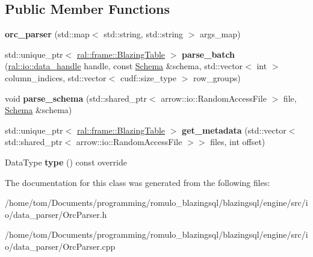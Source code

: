 \subsection*{Public Member Functions}
\begin{DoxyCompactItemize}
\item 
\mbox{\label{classral_1_1io_1_1orc__parser_af352d5ef0c56ae3cf70afc26cdf0ba78}} 
{\bfseries orc\+\_\+parser} (std\+::map$<$ std\+::string, std\+::string $>$ args\+\_\+map)
\item 
\mbox{\label{classral_1_1io_1_1orc__parser_a67cf475095de14b92c1c61a8f784230d}} 
std\+::unique\+\_\+ptr$<$ \hyperlink{classral_1_1frame_1_1BlazingTable}{ral\+::frame\+::\+Blazing\+Table} $>$ {\bfseries parse\+\_\+batch} (\hyperlink{structral_1_1io_1_1data__handle}{ral\+::io\+::data\+\_\+handle} handle, const \hyperlink{classral_1_1io_1_1Schema}{Schema} \&schema, std\+::vector$<$ int $>$ column\+\_\+indices, std\+::vector$<$ cudf\+::size\+\_\+type $>$ row\+\_\+groups)
\item 
\mbox{\label{classral_1_1io_1_1orc__parser_ad3ac521b63ec30e23d2759b6c37c8ece}} 
void {\bfseries parse\+\_\+schema} (std\+::shared\+\_\+ptr$<$ arrow\+::io\+::\+Random\+Access\+File $>$ file, \hyperlink{classral_1_1io_1_1Schema}{Schema} \&schema)
\item 
\mbox{\label{classral_1_1io_1_1orc__parser_aa25ff68d31995b000b7805f0f313e46b}} 
std\+::unique\+\_\+ptr$<$ \hyperlink{classral_1_1frame_1_1BlazingTable}{ral\+::frame\+::\+Blazing\+Table} $>$ {\bfseries get\+\_\+metadata} (std\+::vector$<$ std\+::shared\+\_\+ptr$<$ arrow\+::io\+::\+Random\+Access\+File $>$$>$ files, int offset)
\item 
\mbox{\label{classral_1_1io_1_1orc__parser_a91a7ef5f1263d5ce111b691250176e6b}} 
Data\+Type {\bfseries type} () const override
\end{DoxyCompactItemize}


The documentation for this class was generated from the following files\+:\begin{DoxyCompactItemize}
\item 
/home/tom/\+Documents/programming/romulo\+\_\+blazingsql/blazingsql/engine/src/io/data\+\_\+parser/Orc\+Parser.\+h\item 
/home/tom/\+Documents/programming/romulo\+\_\+blazingsql/blazingsql/engine/src/io/data\+\_\+parser/Orc\+Parser.\+cpp\end{DoxyCompactItemize}
